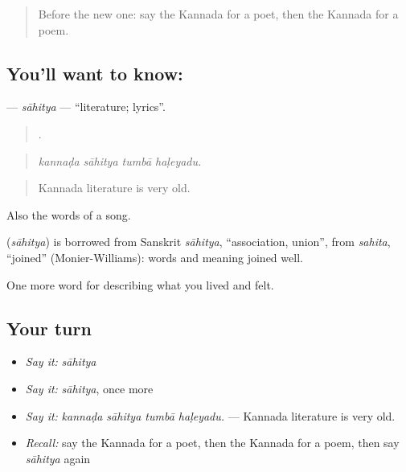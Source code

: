 \label{lesson:KA-C537-sahitya}



\begin{quote}
Before the new one: say the Kannada for a poet, then the Kannada for a poem.
\end{quote}

\subsection*{You'll want to know: }
\textbf{} — \emph{sāhitya} — \textquotedblleft{}literature; lyrics\textquotedblright{}.

\begin{quote}
   .
\end{quote}

\begin{quote}
\emph{kannaḍa sāhitya tumbā haḷeyadu.}
\end{quote}

\begin{quote}
Kannada literature is very old.
\end{quote}

Also the words of a song.

\begin{cousinweb}
\textbf{} (\emph{sāhitya}) is borrowed from Sanskrit \emph{sāhitya}, \textquotedblleft{}association, union\textquotedblright{}, from \emph{sahita}, \textquotedblleft{}joined\textquotedblright{} (Monier-Williams): words and meaning joined well.
\end{cousinweb}

\begin{grammarlens}[title={What you've built}]
One more word for describing what you lived and felt.
\end{grammarlens}

\subsection*{Your turn}
\begin{itemize}
\raggedright
  \item \emph{Say it:} \emph{sāhitya}
  \item \emph{Say it:} \emph{sāhitya}, once more
  \item \emph{Say it:} \emph{kannaḍa sāhitya tumbā haḷeyadu.} — Kannada literature is very old.
  \item \emph{Recall:} say the Kannada for a poet, then the Kannada for a poem, then say \emph{sāhitya} again
\end{itemize}

